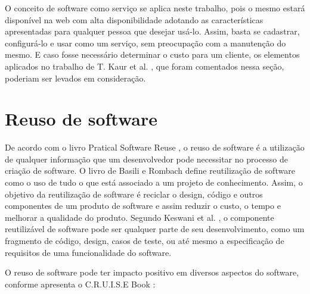 O conceito de software como serviço se aplica neste trabalho, pois o mesmo estará disponível na web com alta disponibilidade adotando as características apresentadas para qualquer pessoa que desejar usá-lo. Assim, basta se cadastrar, configurá-lo e usar como um serviço, sem preocupação com a manutenção do mesmo. E caso fosse necessário determinar o custo para um cliente, os elementos aplicados no trabalho de T. Kaur et al. \citep{6949281}, que foram comentados nessa seção, poderiam ser levados em consideração.


\section{Reuso de software}\label{sec:reuso} %


De acordo com o livro Pratical Software Reuse \citep{Ezran2002}, o reuso de software é a utilização de qualquer informação que um desenvolvedor pode necessitar no processo de criação de software. O livro de Basili e Rombach \citep{Basili1991} define reutilização de software como o uso de tudo o que está associado a um projeto de conhecimento.
Assim, o objetivo da reutilização de software é reciclar o design, código e outros componentes de um produto de software e assim reduzir o custo, o tempo e melhorar a qualidade do produto.
Segundo Keswani et al. \cite{6783445}, o componente reutilizável de software pode ser qualquer parte de seu desenvolvimento, como um fragmento de código, design, casos de teste, ou até mesmo a especificação de requisitos de uma funcionalidade do software. 

O reuso de software pode ter impacto positivo em diversos aspectos do software, conforme apresenta o C.R.U.I.S.E Book \citep{cruise2007} :

